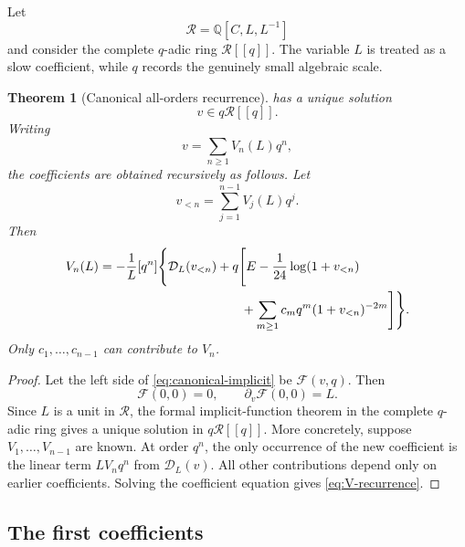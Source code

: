 \documentclass[11pt,a4paper]{article}
\numberwithin{equation}{section}
\newtheorem{theorem}{Theorem}[section]
\theoremstyle{remark}
\newcommand{\coeff}[2]{[{}#1^{#2}]}
\begin{document}
Let
\[
\mathscr R=\mathbb Q[C,L,L^{-1}]
\]
and consider the complete \(q\)-adic ring \(\mathscr R[[q]]\).  The variable
\(L\) is treated as a slow coefficient, while \(q\) records the genuinely
small algebraic scale.

\begin{theorem}[Canonical all-orders recurrence]
\label{thm:canonical-recurrence}
 has a unique solution
\[
v\in q\mathscr R[[q]].
\]
Writing
\[
v=\sum_{n\ge1}V_n(L)q^n,
\]
the coefficients are obtained recursively as follows.  Let
\[
v_{<n}=\sum_{j=1}^{n-1}V_j(L)q^j.
\]
Then
\begin{align}
V_n(L)=-\frac1L\coeff{q}{n}\Bigg\{
&\mathcal D_L(v_{<n})
+q\Bigg[E-\frac1{24}\log(1+v_{<n})
\notag\\
&\hspace{20mm}+
\sum_{m\ge1}c_mq^m(1+v_{<n})^{-2m}\Bigg]
\Bigg\}.
\label{eq:V-recurrence}
\end{align}
Only \(c_1,\ldots,c_{n-1}\) can contribute to \(V_n\).
\end{theorem}

\begin{proof}
Let the left side of \cref{eq:canonical-implicit} be
\(\mathcal F(v,q)\).  Then
\[
\mathcal F(0,0)=0,
\qquad
\partial_v\mathcal F(0,0)=L.
\]
Since \(L\) is a unit in \(\mathscr R\), the formal implicit-function theorem
in the complete \(q\)-adic ring gives a unique solution in
\(q\mathscr R[[q]]\).  More concretely, suppose
\(V_1,\ldots,V_{n-1}\) are known.  At order \(q^n\), the only occurrence of
the new coefficient is the linear term \(LV_nq^n\) from
\(\mathcal D_L(v)\).  All other contributions depend only on earlier
coefficients.  Solving the coefficient equation gives
\cref{eq:V-recurrence}.
\end{proof}

\subsection{The first coefficients}
\end{document}
